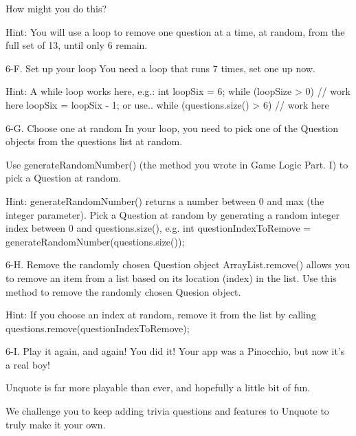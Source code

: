                 How might you do this?

                        Hint: You will use a loop to remove one question at a time, at random, from the full set of 13, until only 6 remain.
        
        6-F. Set up your loop
                You need a loop that runs 7 times, set one up now.

                        Hint: A while loop works here, e.g.:
                                int loopSix = 6;
                                while (loopSize > 0) {
                                        // work here
                                        loopSix = loopSix - 1;
                                }
                        or use..
                                while (questions.size() > 6) {
                                        // work here
                                }
        
        6-G. Choose one at random
                In your loop, you need to pick one of the Question objects from the questions list at random.

                Use generateRandomNumber() (the method you wrote in Game Logic Part. I) to pick a Question at random.

                        Hint: generateRandomNumber() returns a number between 0 and max (the integer parameter).
                        Pick a Question at random by generating a random integer index between 0 and questions.size(), e.g.
                                int questionIndexToRemove = generateRandomNumber(questions.size());
        
        6-H. Remove the randomly chosen Question object
                ArrayList.remove() allows you to remove an item from a list based on its location (index) in the list. Use this method to remove the randomly chosen Quesion object.

                        Hint: If you choose an index at random, remove it from the list by calling questions.remove(questionIndexToRemove);

        6-I. Play it again, and again!
                You did it! Your app was a Pinocchio, but now it’s a real boy!

                Unquote is far more playable than ever, and hopefully a little bit of fun.

                We challenge you to keep adding trivia questions and features to Unquote to truly make it your own.